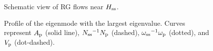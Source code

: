 \newpage


\begin{figure}
\caption{Schematic view of RG flows near $H_{\rm ss}$. }
\label{fig0}
\end{figure}



\begin{figure}
\caption{Profile of the eigenmode with the largest eigenvalue.
        Curves represent $A_{\rm p}$ (solid
        line), $N_{\rm ss}{}^{-1}N_{\rm p}$ (dashed),
        $\omega_{\rm ss}{}^{-1}\omega_{\rm p}$ (dotted),
        and $V_{\rm p}$ (dot-dashed).}
\label{fig2}
\end{figure}





